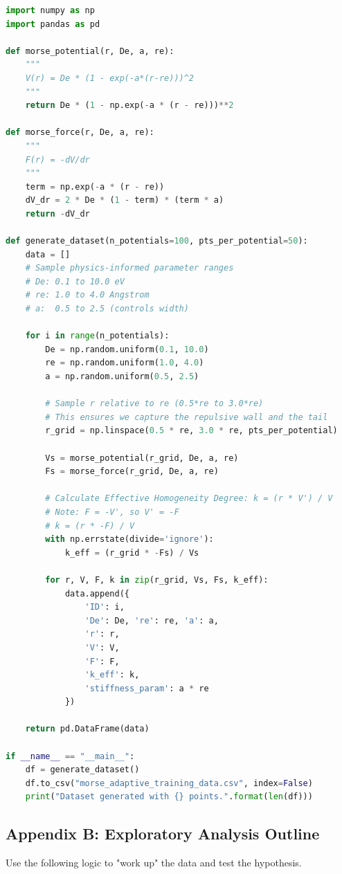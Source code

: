 \documentclass[11pt, a4paper]{article}
\begin{document}
\begin{lstlisting}[language=Python, caption=generate\_morse\_data.py]
import numpy as np
import pandas as pd

def morse_potential(r, De, a, re):
    """
    V(r) = De * (1 - exp(-a*(r-re)))^2
    """
    return De * (1 - np.exp(-a * (r - re)))**2

def morse_force(r, De, a, re):
    """
    F(r) = -dV/dr
    """
    term = np.exp(-a * (r - re))
    dV_dr = 2 * De * (1 - term) * (term * a)
    return -dV_dr

def generate_dataset(n_potentials=100, pts_per_potential=50):
    data = []
    # Sample physics-informed parameter ranges
    # De: 0.1 to 10.0 eV
    # re: 1.0 to 4.0 Angstrom
    # a:  0.5 to 2.5 (controls width)
    
    for i in range(n_potentials):
        De = np.random.uniform(0.1, 10.0)
        re = np.random.uniform(1.0, 4.0)
        a = np.random.uniform(0.5, 2.5)
        
        # Sample r relative to re (0.5*re to 3.0*re)
        # This ensures we capture the repulsive wall and the tail
        r_grid = np.linspace(0.5 * re, 3.0 * re, pts_per_potential)
        
        Vs = morse_potential(r_grid, De, a, re)
        Fs = morse_force(r_grid, De, a, re)
        
        # Calculate Effective Homogeneity Degree: k = (r * V') / V
        # Note: F = -V', so V' = -F
        # k = (r * -F) / V
        with np.errstate(divide='ignore'):
            k_eff = (r_grid * -Fs) / Vs
            
        for r, V, F, k in zip(r_grid, Vs, Fs, k_eff):
            data.append({
                'ID': i,
                'De': De, 're': re, 'a': a,
                'r': r,
                'V': V,
                'F': F,
                'k_eff': k,
                'stiffness_param': a * re 
            })
            
    return pd.DataFrame(data)

if __name__ == "__main__":
    df = generate_dataset()
    df.to_csv("morse_adaptive_training_data.csv", index=False)
    print("Dataset generated with {} points.".format(len(df)))
\end{lstlisting}

\subsection{Appendix B: Exploratory Analysis Outline}
Use the following logic to "work up" the data and test the hypothesis.
\end{document}
